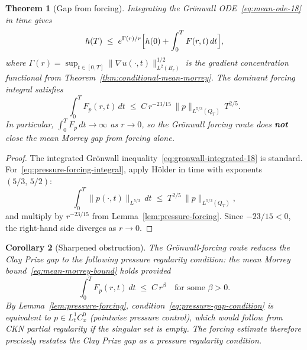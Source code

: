 \documentclass[11pt]{article}
\newtheorem{theorem}{Theorem}[section]
\newtheorem{corollary}[theorem]{Corollary}
\theoremstyle{definition}
\theoremstyle{remark}
\begin{document}
\begin{theorem}[Gap from forcing]\label{thm:forcing-gap}
  Integrating the Gr\"{o}nwall ODE~\eqref{eq:mean-ode-18} in time gives
  \begin{equation}\label{eq:gronwall-integrated-18}
    h(T) \;\leq\; e^{\Gamma(r)/r}\Bigl[h(0) + \int_0^T F(r,t)\,dt\Bigr],
  \end{equation}
  where $\Gamma(r) = \sup_{t\in[0,T]}\|\nabla u(\cdot,t)\|_{L^{2}(B_r)}^{1/2}$
  is the gradient concentration functional from Theorem~\ref{thm:conditional-mean-morrey}.
  The dominant forcing integral satisfies
  \begin{equation}\label{eq:pressure-forcing-integral}
    \int_0^T F_p(r,t)\,dt
    \;\leq\; C\,r^{-23/15}\,\|p\|_{L^{5/3}(Q_T)}\,T^{2/5}.
  \end{equation}
  In particular, $\int_0^T F_p\,dt \to \infty$ as $r\to 0$, so the Gr\"{o}nwall
  forcing route does \textbf{not} close the mean Morrey gap from forcing alone.
\end{theorem}
\begin{proof}
The integrated Gr\"{o}nwall inequality~\eqref{eq:gronwall-integrated-18} is
standard.  For~\eqref{eq:pressure-forcing-integral}, apply H\"{o}lder in time
with exponents $(5/3,\,5/2)$:
\[
  \int_0^T\|p(\cdot,t)\|_{L^{5/3}}\,dt
  \;\leq\; T^{2/5}\,\|p\|_{L^{5/3}(Q_T)},
\]
and multiply by $r^{-23/15}$ from Lemma~\ref{lem:pressure-forcing}.  Since
$-23/15 < 0$, the right-hand side diverges as $r\to 0$.
\end{proof}

\begin{corollary}[Sharpened obstruction]\label{cor:sharpened-obstruction}
  The Gr\"{o}nwall-forcing route reduces the Clay Prize gap to the following
  pressure regularity condition: the mean Morrey bound~\eqref{eq:mean-morrey-bound}
  holds provided
  \begin{equation}\label{eq:pressure-gap-condition}
    \int_0^T F_p(r,t)\,dt \;\leq\; C\,r^\beta
    \quad\text{for some } \beta > 0.
  \end{equation}
  By Lemma~\ref{lem:pressure-forcing}, condition~\eqref{eq:pressure-gap-condition}
  is equivalent to $p\in L^1_t C^0_x$ (pointwise pressure control), which would
  follow from CKN partial regularity if the singular set is empty.  The forcing
  estimate therefore \emph{precisely restates the Clay Prize gap as a pressure
  regularity condition}.
\end{corollary}
\end{document}
